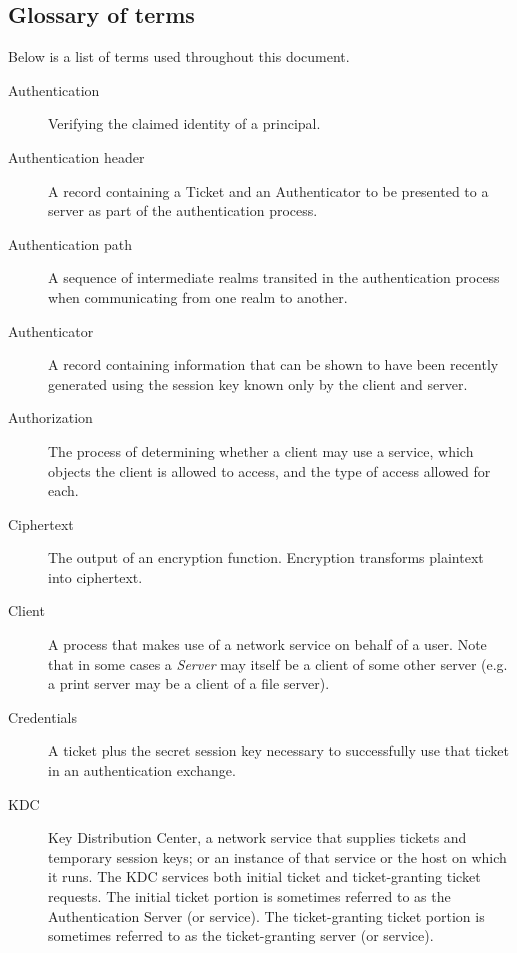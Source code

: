 \subsection{Glossary of terms}

Below is a list of terms used throughout this document.

\begin{description}
\item [Authentication] 
Verifying the claimed identity of a principal.

\item [Authentication header]
A record containing a Ticket and an Authenticator to be presented to a
server as part of the authentication process.

\item [Authentication path]
A sequence of intermediate realms transited in the authentication
process when communicating from one realm to another.

\item [Authenticator]
A record containing information that can be shown to
have been recently generated using the session key known only by the 
client and server.

\item [Authorization]
The process of determining whether a client may use a
service,  which objects the client is allowed to access, and the 
type of access allowed for each.

\item [Ciphertext]
The output of an encryption function.  Encryption transforms plaintext
into ciphertext.

\item [Client]
A process that makes use of a network service on behalf of a
user.  Note that in some cases a {\em Server} may itself be a client of
some other server (e.g. a print server may be a client of a file server).

\item [Credentials]
A ticket plus the secret session key necessary to
successfully use that ticket in an authentication exchange.

\item [KDC]
Key Distribution Center, a network service that supplies
tickets and temporary session keys; or an
instance of that service or the host on which it runs.
The KDC services both initial ticket and ticket-granting ticket
requests.
The initial ticket portion is sometimes referred to as the
Authentication Server (or service).
The ticket-granting ticket portion is sometimes referred to as the
ticket-granting server (or service).


\end{description}
